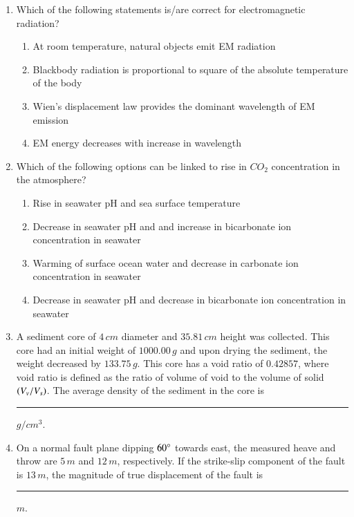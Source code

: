 \documentclass[journal,12pt,onecolumn]{IEEEtran}
\theoremstyle{remark}
\begin{document}
\begin{enumerate}
\item Which of the following statements is/are correct for electromagnetic  radiation? \hfill{}
\begin{enumerate}
    \item At room temperature, natural objects emit EM radiation
    \item Blackbody radiation is proportional to square of the absolute temperature of the body
    \item Wien's displacement law provides the dominant wavelength of EM emission
    \item EM energy decreases with increase in wavelength
\end{enumerate}

\item Which of the following options can be linked to rise in $CO_2$ concentration in the atmosphere? \hfill{}
\begin{enumerate}
    \item Rise in seawater pH and sea surface temperature
    \item Decrease in seawater pH and and increase in bicarbonate ion concentration in seawater
    \item Warming of surface ocean water and decrease in carbonate ion concentration in seawater
    \item Decrease in seawater pH and decrease in bicarbonate ion concentration in seawater
\end{enumerate}

\item A sediment core of $4\,cm$ diameter and $35.81\,cm$ height was collected. This core had an initial weight of $1000.00\,g$ and upon drying the sediment, the weight decreased by $133.75\,g$. This core has a void ratio of $0.42857$, where void ratio is defined as the ratio of volume of void to the volume of solid $\left(V_v/V_s\right)$. The average density of the sediment in the core is \rule{3cm}{0.15mm} $g/cm^3$.  \hfill{}

\item On a normal fault plane dipping $60\degree$ towards east, the measured heave and throw are $5\,m$ and $12\,m$, respectively. If the strike-slip component of the fault is $13\,m$, the magnitude of true displacement of the fault is \rule{3cm}{0.15mm} $m$.  \hfill{}


\end{enumerate}
\end{document}
